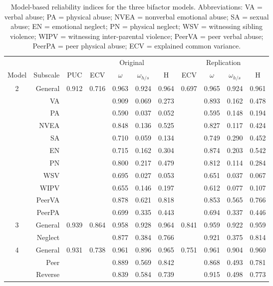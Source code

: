 \documentclass[letterpaper,man,natbib]{apa6}  %
\begin{document}
\begin{table}
\centering
\begin{tabular*}{\textwidth}{crccccccccc}
\toprule
& & & \multicolumn{4}{c}{Original} & \multicolumn{4}{c}{Replication} \\
\cmidrule(lr){4-7}\cmidrule(lr){8-11}
Model & Subscale & PUC & ECV & $\omega$ & $\omega_{h/s}$ & H & ECV & $\omega$ & $\omega_{h/s}$ & H \\
\midrule
2 & General  &  0.912&0.716 &  0.963 &   0.924 &  0.964&0.697 &  0.965 &   0.924 &  0.961 \\
& VA       &       &      &  0.909 &   0.069 &  0.273&      &  0.893 &   0.162 &  0.478 \\
& PA       &       &      &  0.590 &   0.037 &  0.052&      &  0.595 &   0.148 &  0.194 \\
& NVEA     &       &      &  0.848 &   0.136 &  0.525&      &  0.827 &   0.117 &  0.424 \\
& SA       &       &      &  0.710 &   0.059 &  0.134&     &  0.749 &   0.290 &  0.452 \\
& EN       &       &      &  0.715 &   0.162 &  0.304&     &  0.874 &   0.203 &  0.542 \\
& PN       &       &      &  0.800 &   0.217 &  0.479&     &  0.812 &   0.114 &  0.284 \\
& WSV      &       &      &  0.695 &   0.027 &  0.053&     &  0.651 &   0.037 &  0.067 \\
& WIPV     &       &      &  0.655 &   0.146 &  0.197&      &  0.612 &   0.077 &  0.107 \\
& PeerVA   &       &      &  0.878 &   0.621 &  0.818&     &  0.853 &   0.565 &  0.766 \\
& PeerPA   &       &      &  0.699 &   0.335 &  0.443&     &  0.694 &   0.337 &  0.446 \\
\midrule
3 & General &  0.939&0.864 &  0.958 &   0.928 &  0.964&0.841 &  0.959 &   0.922 &  0.959 \\
& Neglect &       &      &  0.877 &   0.384 &  0.766&      &  0.921 &   0.375 &  0.814 \\
\midrule
4 & General &  0.931&0.738 &  0.961 &   0.896 &  0.965&0.751 &  0.961 &   0.904 &  0.960 \\
& Peer    &       &      &  0.889 &   0.569 &  0.842&      &  0.868 &   0.493 &  0.781 \\
& Reverse &       &      &  0.839 &   0.584 &  0.739&     &  0.915 &   0.498 &  0.773 \\
\bottomrule
\end{tabular*}
\captionsetup{width=1.\textwidth}
\caption{\normalfont Model-based reliability indices for the three bifactor models. Abbreviations: VA = verbal abuse; PA = physical abuse; NVEA = nonverbal emotional abuse; SA = sexual abuse; EN = emotional neglect; PN = physical neglect; WSV = witnessing sibling violence; WIPV = witnessing inter-parental violence; PeerVA = peer verbal abuse; PeerPA = peer physical abuse; ECV = explained common variance.}
\label{table:reliability}
\end{table}
\end{document}
